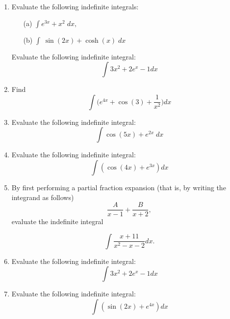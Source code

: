 \documentclass[a4paper,12pt]{article}
\begin{document}
\begin{enumerate}
	\item  Evaluate the following indefinite integrals:
	\begin{multicols}{2}
	\begin{itemize}
		\item[(a)] $\displaystyle{ \int  e^{3x} + x^2\; dx, }  $
		\item[(b)] $\displaystyle{ \int \;\sin(2x)+ \cosh(x)\; dx}$
		
	\end{itemize}
	\end{multicols}
	Evaluate the following indefinite integral: 
	\[\int 3x^2 +2e^x -1 dx\] 

	\item Find \[\int \bigg(e^{4x} + \cos(3) + \frac{1}{x^2} \bigg)dx\]
	
\item Evaluate the following indefinite integral:
\[ \int \cos(5x)+e^{2x}\; dx   \]
\item Evaluate the following indefinite integral:
\[ \int (\cos(4x)+e^{3x}) dx   \]
	\smallskip
	\item  By first performing a partial fraction expansion (that is, by writing the integrand
	as follows)
	\[  \frac{A}{x - 1} + \frac{B}{x + 2},
	\]evaluate the indefinite integral
	
	\[ \int \frac{x + 11}{x^2 - x - 2}  dx. \]

	\item
	Evaluate the following indefinite integral: 
	\[\int 3x^2 +2e^x -1 dx\] 

	


\item Evaluate the following indefinite integral:
\[ \int (\sin(2x)+e^{4x}) dx   \]

\end{enumerate}
\end{document}
